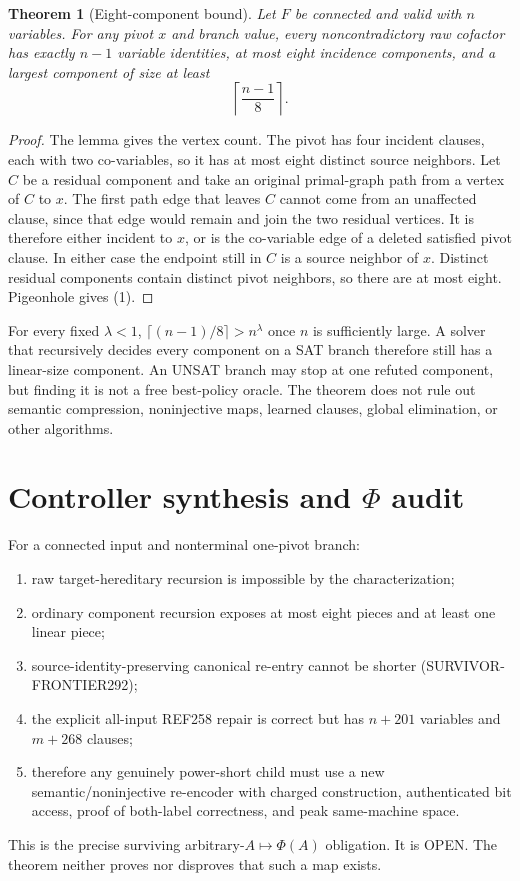 \documentclass[11pt]{article}
\newtheorem{theorem}{Theorem}
\newcommand{\status}[1]{\textsf{#1}}
\begin{document}
\begin{theorem}[Eight-component bound]
Let $F$ be connected and valid with $n$ variables.  For any pivot $x$ and branch value, every noncontradictory raw cofactor has exactly $n-1$ variable identities, at most eight incidence components, and a largest component of size at least
\[
 \left\lceil\frac{n-1}{8}\right\rceil.                  \tag{1}
\]
\end{theorem}
\begin{proof}
The lemma gives the vertex count.  The pivot has four incident clauses, each with two co-variables, so it has at most eight distinct source neighbors.  Let $C$ be a residual component and take an original primal-graph path from a vertex of $C$ to $x$.  The first path edge that leaves $C$ cannot come from an unaffected clause, since that edge would remain and join the two residual vertices.  It is therefore either incident to $x$, or is the co-variable edge of a deleted satisfied pivot clause.  In either case the endpoint still in $C$ is a source neighbor of $x$.  Distinct residual components contain distinct pivot neighbors, so there are at most eight.  Pigeonhole gives (1).
\end{proof}

For every fixed $\lambda<1$, $\lceil(n-1)/8\rceil>n^\lambda$ once $n$ is sufficiently large.  A solver that recursively decides every component on a SAT branch therefore still has a linear-size component.  An UNSAT branch may stop at one refuted component, but finding it is not a free best-policy oracle.  The theorem does not rule out semantic compression, noninjective maps, learned clauses, global elimination, or other algorithms.

\section{Controller synthesis and $\Phi$ audit}
For a connected input and nonterminal one-pivot branch:
\begin{enumerate}
\item raw target-hereditary recursion is impossible by the characterization;
\item ordinary component recursion exposes at most eight pieces and at least one linear piece;
\item source-identity-preserving canonical re-entry cannot be shorter (SURVIVOR-FRONTIER292);
\item the explicit all-input REF258 repair is correct but has $n+201$ variables and $m+268$ clauses;
\item therefore any genuinely power-short child must use a new semantic/noninjective re-encoder with charged construction, authenticated bit access, proof of both-label correctness, and peak same-machine space.
\end{enumerate}
This is the precise surviving arbitrary-$A\mapsto\Phi(A)$ obligation.  It is \status{OPEN}.  The theorem neither proves nor disproves that such a map exists.
\end{document}
